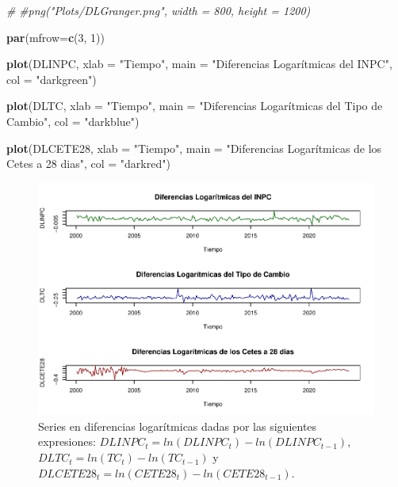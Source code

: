 \documentclass[
]{book}
\newenvironment{Shaded}{\begin{snugshade}}{\end{snugshade}}
\newcommand{\AttributeTok}[1]{\textcolor[rgb]{0.13,0.29,0.53}{#1}}
\newcommand{\CommentTok}[1]{\textcolor[rgb]{0.56,0.35,0.01}{\textit{#1}}}
\newcommand{\DecValTok}[1]{\textcolor[rgb]{0.00,0.00,0.81}{#1}}
\newcommand{\FunctionTok}[1]{\textcolor[rgb]{0.13,0.29,0.53}{\textbf{#1}}}
\newcommand{\NormalTok}[1]{#1}
\newcommand{\StringTok}[1]{\textcolor[rgb]{0.31,0.60,0.02}{#1}}
\begin{document}
\begin{Shaded}
\begin{Highlighting}[]
\CommentTok{\#}
\CommentTok{\#png("Plots/DLGranger.png", width = 800, height = 1200)}

\FunctionTok{par}\NormalTok{(}\AttributeTok{mfrow=}\FunctionTok{c}\NormalTok{(}\DecValTok{3}\NormalTok{, }\DecValTok{1}\NormalTok{))}

\FunctionTok{plot}\NormalTok{(DLINPC, }\AttributeTok{xlab =} \StringTok{"Tiempo"}\NormalTok{, }
     \AttributeTok{main =} \StringTok{"Diferencias Logarítmicas del INPC"}\NormalTok{,}
     \AttributeTok{col =} \StringTok{"darkgreen"}\NormalTok{)}

\FunctionTok{plot}\NormalTok{(DLTC, }\AttributeTok{xlab =} \StringTok{"Tiempo"}\NormalTok{, }
     \AttributeTok{main =} \StringTok{"Diferencias Logarítmicas del Tipo de Cambio"}\NormalTok{,}
     \AttributeTok{col =} \StringTok{"darkblue"}\NormalTok{)}

\FunctionTok{plot}\NormalTok{(DLCETE28, }\AttributeTok{xlab =} \StringTok{"Tiempo"}\NormalTok{, }
     \AttributeTok{main =} \StringTok{"Diferencias Logarítmicas de los Cetes a 28 dias"}\NormalTok{,}
     \AttributeTok{col =} \StringTok{"darkred"}\NormalTok{)}
\end{Highlighting}
\end{Shaded}

\begin{figure}

{\centering \includegraphics{Notas-Series-Tiempo_files/figure-latex/fig61-1} 

}

\caption{Series en diferencias logarítmicas dadas por las siguientes expresiones: $DLINPC_t = ln(DLINPC_t) - ln(DLINPC_{t-1})$, $DLTC_t = ln(TC_t) - ln(TC_{t-1})$ y $DLCETE28_t = ln(CETE28_t) - ln(CETE28_{t-1})$.}\label{fig:fig61}
\end{figure}
\end{document}
